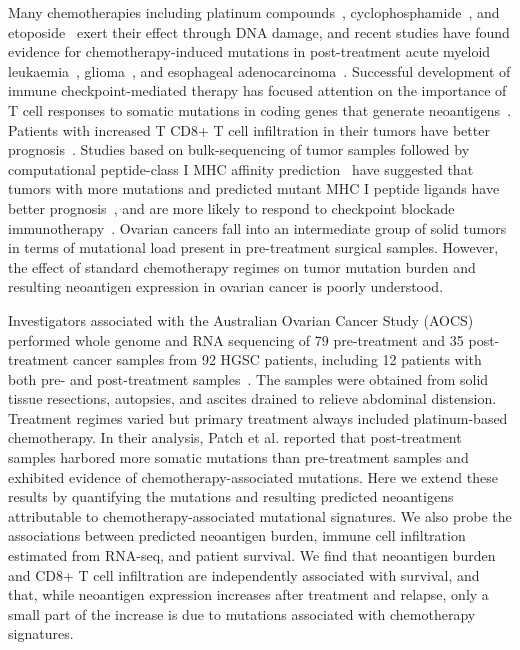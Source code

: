 \documentclass[linenumbers]{bmcart}
\begin{document}
Many chemotherapies including platinum compounds~\cite{Hannan_1989}, cyclophosphamide~\cite{Anderson_1995}, and etoposide~\cite{NAKANOMYO_1986} exert their effect through DNA damage, and recent studies have found evidence for chemotherapy-induced mutations in post-treatment acute myeloid leukaemia~\cite{Ding_2012}, glioma~\cite{Johnson_2013}, and esophageal adenocarcinoma~\cite{Murugaesu_2015}. Successful development of immune checkpoint-mediated therapy\cite{Chen_2013} has focused attention on the importance of T cell responses to somatic mutations in coding genes that generate neoantigens~\cite{Schumacher_2015}. Patients with increased T CD8+ T cell infiltration in their tumors have better prognosis~\cite{Sato2005,Hamanishi2007}. Studies based on bulk-sequencing of tumor samples followed by computational peptide-class I MHC affinity prediction~\cite{Lundegaard_2007} have suggested that tumors with more mutations and predicted mutant MHC I peptide ligands have better prognosis~\cite{Brown_2014}, and are more likely to respond to checkpoint blockade immunotherapy~\cite{Van_Allen_2015,Rizvi_2015}. Ovarian cancers fall into an intermediate group of solid tumors in terms of mutational load present in pre-treatment surgical samples\cite{Lawrence_2013}. However, the effect of standard chemotherapy regimes on tumor mutation burden and resulting neoantigen expression in ovarian cancer is poorly understood.

Investigators associated with the Australian Ovarian Cancer Study (AOCS) performed whole genome and RNA sequencing of 79 pre-treatment and 35 post-treatment cancer samples from 92 HGSC patients, including 12 patients with both pre- and post-treatment samples~\cite{Patch_2015}. The samples were obtained from solid tissue resections, autopsies, and ascites drained to relieve abdominal distension. Treatment regimes varied but primary treatment always included platinum-based chemotherapy. In their analysis, Patch et al. reported that post-treatment samples harbored more somatic mutations than pre-treatment samples and exhibited evidence of chemotherapy-associated mutations. Here we extend these results by quantifying the mutations and resulting predicted neoantigens attributable to chemotherapy-associated mutational signatures. We also probe the associations between predicted neoantigen burden, immune cell infiltration estimated from RNA-seq, and patient survival. We find that neoantigen burden and CD8+ T cell infiltration are independently associated with survival, and that, while neoantigen expression increases after treatment and relapse, only a small part of the increase is due to mutations associated with chemotherapy signatures. 
\end{document}
